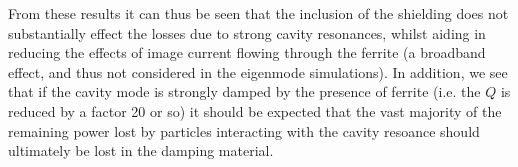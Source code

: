 From these results it can thus be seen that the inclusion of the shielding does not substantially effect the losses due to strong cavity resonances, whilst aiding in reducing the effects of image current flowing through the ferrite (a broadband effect, and thus not considered in the eigenmode simulations). In addition, we see that if the cavity mode is strongly damped by the presence of ferrite (i.e. the $Q$ is reduced by a factor 20 or so) it should be expected that the vast majority of the remaining power lost by particles interacting with the cavity resoance should ultimately be lost in the damping material. 